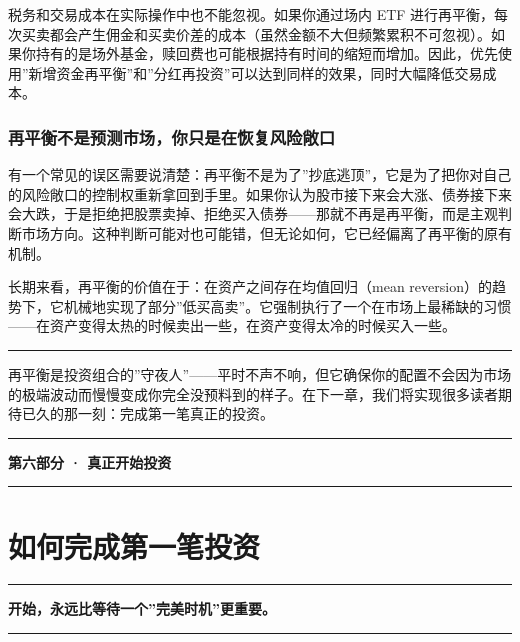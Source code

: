 \documentclass[a4paper,11pt,oneside,fontset=none,UTF8,zihao=-4]{ctexbook}
\newcommand{\partdivider}[1]{%
  \clearpage
  \thispagestyle{empty}%
  \vspace*{5.0cm}%
  \begin{center}%
    {\color{dh-blossom}\rule{0.35\textwidth}{1.5pt}\par}%
    \vspace{1.2cm}%
    {\Huge\bfseries\sffamily\color{dh-navy} #1\par}%
    \vspace{1.2cm}%
    {\color{dh-blossom}\rule{0.35\textwidth}{1.5pt}\par}%
  \end{center}%
  \vfill
  \clearpage
}
\begin{document}
税务和交易成本在实际操作中也不能忽视。如果你通过场内 ETF
进行再平衡，每次买卖都会产生佣金和买卖价差的成本（虽然金额不大但频繁累积不可忽视）。如果你持有的是场外基金，赎回费也可能根据持有时间的缩短而增加。因此，优先使用''新增资金再平衡''和''分红再投资''可以达到同样的效果，同时大幅降低交易成本。

\subsection{再平衡不是预测市场，你只是在恢复风险敞口}\label{ux518dux5e73ux8861ux4e0dux662fux9884ux6d4bux5e02ux573aux4f60ux53eaux662fux5728ux6062ux590dux98ceux9669ux655eux53e3}

有一个常见的误区需要说清楚：再平衡不是为了''抄底逃顶''，它是为了把你对自己的风险敞口的控制权重新拿回到手里。如果你认为股市接下来会大涨、债券接下来会大跌，于是拒绝把股票卖掉、拒绝买入债券------那就不再是再平衡，而是主观判断市场方向。这种判断可能对也可能错，但无论如何，它已经偏离了再平衡的原有机制。

长期来看，再平衡的价值在于：在资产之间存在均值回归（mean
reversion）的趋势下，它机械地实现了部分''低买高卖''。它强制执行了一个在市场上最稀缺的习惯------在资产变得太热的时候卖出一些，在资产变得太冷的时候买入一些。

\begin{center}{\color{dh-bronze}\rule{0.2\textwidth}{0.5pt}}\end{center}

再平衡是投资组合的''守夜人''------平时不声不响，但它确保你的配置不会因为市场的极端波动而慢慢变成你完全没预料到的样子。在下一章，我们将实现很多读者期待已久的那一刻：完成第一笔真正的投资。

\partdivider{第六部分 · 真正开始投资}

\newpage

\chapter{如何完成第一笔投资}\label{ux5982ux4f55ux5b8cux6210ux7b2cux4e00ux7b14ux6295ux8d44}

\begin{center}{\color{dh-bronze}\rule{0.2\textwidth}{0.5pt}}\end{center}

\begin{dhquote}
\textbf{开始，永远比等待一个''完美时机''更重要。}
\end{dhquote}

\begin{center}{\color{dh-bronze}\rule{0.2\textwidth}{0.5pt}}\end{center}
\end{document}
